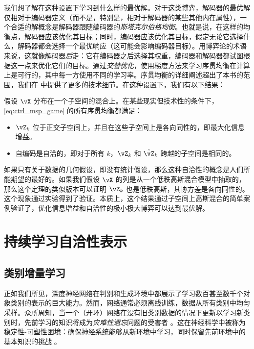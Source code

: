 \documentclass[../../book-main_zh.tex]{subfiles}
\begin{document}
我们想了解在这种设置下学习到什么样的最优解。对于这类博弈，解码器的最优解仅相对于编码器定义（而不是，特别是，相对于解码器的某些其他内在属性），一个合适的解概念是解码器跟随编码器的\textit{斯塔克尔伯格均衡}。也就是说，在这样的均衡点，解码器应该优化其目标；同时，编码器应该优化其目标，假定无论它选择什么，解码器都会选择一个最优响应（这可能会影响编码器目标）。用博弈论的术语来说，这就像解码器\textit{后}走：它在编码器之后选择其权重，编码器和解码器都试图根据这一点来优化它们的目标。通过\textit{交替优化}，使用梯度方法来学习序贯均衡在计算上是可行的，其中每一方使用不同的学习率。序贯均衡的详细阐述超出了本书的范围，我们在  中提供了更多的技术细节。在这种设置下，我们有以下结果：
\begin{theorem}\label{thm:ctrl_theory}
    假设 \(\vX\) 分布在一个子空间的混合上。在某些现实但技术性的条件下，\eqref{eq:ctrl_msp_game} 的所有序贯均衡都满足：
    \begin{itemize}
        \item \(\vZ_{k}\) 位于正交子空间上，并且在这些子空间上是各向同性的，即最大化信息增益。
        \item 自编码是自洽的，即对于所有 \(k\)，\(\vZ_{k}\) 和 \(\hat{\vZ}_{k}\) 跨越的子空间是相同的。
    \end{itemize}
\end{theorem}
如果只有关于数据的几何假设，即没有统计假设，那么这种自洽性的概念是人们所能期望的最好的。如果我们假设 \(\vX\) 的列是从一个低秩高斯混合模型中抽取的，那么这个定理的类似版本可以证明 \(\vZ_{k}\) 也是低秩高斯，其协方差是各向同性的。这个现象通过实验得到了验证。本质上，这个结果通过子空间上高斯混合的简单案例验证了，优化信息增益和自洽性的极小极大博弈可以达到最优解。






\section{持续学习自洽性表示}
\label{sec:continuous}

\subsection{类别增量学习}
\label{sec:class-wise-incremental}

正如我们所见，深度神经网络在判别和生成环境中都展示了学习数百甚至数千个对象类别的表示的巨大能力。然而，网络通常必须离线训练，数据从所有类别中均匀采样。众所周知，当一个（开环）网络在没有旧类别数据的情况下更新以学习新类别时，先前学习的知识将成为{\em 灾难性遗忘}问题的受害者 \cite{McCloskey1989catastrophic}。这在神经科学中被称为稳定性-可塑性困境：确保神经系统能够从新环境中学习，同时保留先前环境中的基本知识的挑战 \cite{Grossberg1987CompetitiveLF}。
\end{document}
